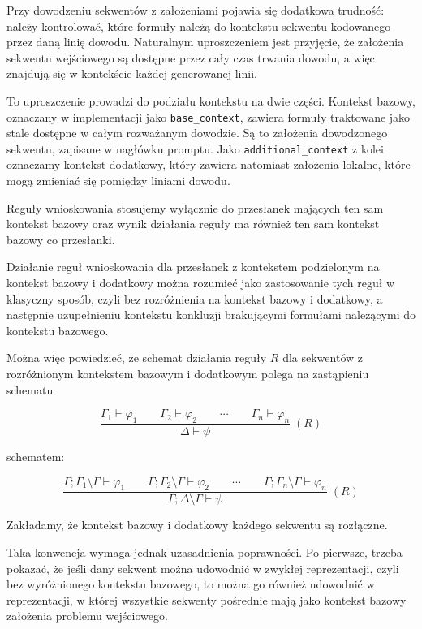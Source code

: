\documentclass[shortabstract]{iithesis}
\theoremstyle{definition}
\theoremstyle{remark}
\theoremstyle{plain}
\begin{document}
Przy dowodzeniu sekwentów z założeniami pojawia się dodatkowa trudność:
należy kontrolować, które formuły należą do kontekstu sekwentu kodowanego przez
daną linię dowodu. Naturalnym uproszczeniem jest przyjęcie, że założenia sekwentu
wejściowego są dostępne przez cały czas trwania dowodu, a więc znajdują się
w kontekście każdej generowanej linii. 

To uproszczenie prowadzi do podziału kontekstu na dwie części. Kontekst bazowy,
oznaczany w implementacji jako \texttt{base\_context}, zawiera formuły traktowane
jako stale dostępne w całym rozważanym dowodzie. Są to założenia
dowodzonego sekwentu, zapisane w nagłówku promptu. Jako \texttt{additional\_context} z kolei oznaczamy kontekst dodatkowy, który zawiera natomiast założenia lokalne,
które mogą zmieniać się pomiędzy liniami dowodu. 

Reguły wnioskowania stosujemy wyłącznie do przesłanek mających ten sam kontekst
bazowy oraz wynik działania reguły ma również ten sam kontekst bazowy co przesłanki. 

Działanie reguł wnioskowania dla przesłanek z kontekstem podzielonym na kontekst bazowy i dodatkowy 
można rozumieć jako zastosowanie tych reguł w klasyczny sposób, czyli
bez rozróżnienia na kontekst bazowy i dodatkowy, a następnie uzupełnieniu kontekstu konkluzji
brakującymi formułami należącymi do kontekstu bazowego. 

Można więc powiedzieć, że schemat działania reguły \(R\) dla sekwentów z rozróżnionym kontekstem bazowym i dodatkowym polega na zastąpieniu schematu

\[
\frac{
    \Gamma_1 \vdash \varphi_1
    \qquad
    \Gamma_2 \vdash \varphi_2
    \qquad
    \cdots
    \qquad
    \Gamma_n \vdash \varphi_n
}{
    \Delta \vdash \psi
}\;(R)
\]

schematem:

\[
\frac{
    \Gamma ; \Gamma_1 \setminus \Gamma \vdash \varphi_1
    \qquad
    \Gamma ; \Gamma_2 \setminus \Gamma \vdash \varphi_2
    \qquad
    \cdots
    \qquad
    \Gamma ; \Gamma_n \setminus \Gamma\vdash \varphi_n
}{
    \Gamma ; \Delta \setminus \Gamma \vdash \psi
}\;(R)
\]

Zakładamy, że kontekst bazowy i dodatkowy każdego sekwentu są rozłączne.

Taka konwencja wymaga jednak uzasadnienia poprawności. Po pierwsze, trzeba
pokazać, że jeśli dany sekwent można udowodnić w zwykłej reprezentacji, czyli bez
wyróżnionego kontekstu bazowego, to można go również udowodnić w reprezentacji,
w której wszystkie sekwenty pośrednie mają jako kontekst bazowy założenia problemu
wejściowego. 
\end{document}
